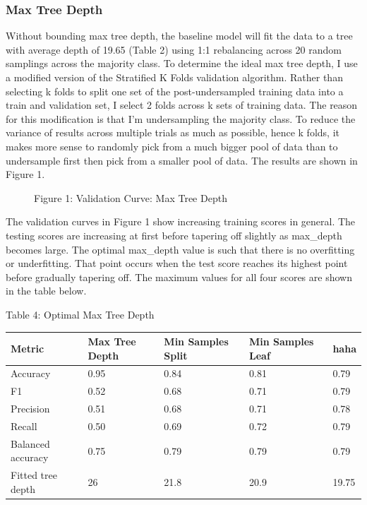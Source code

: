 \documentclass{article}
\begin{document}
\subsubsection*{Max Tree Depth}
Without bounding max tree depth, the baseline model will fit the data to a tree with average depth of 19.65 (Table 2) using 1:1 rebalancing across 20 random samplings across the majority class. To determine the ideal max tree depth, I use a modified version of the Stratified K Folds validation algorithm. Rather than selecting k folds to split one set of the post-undersampled training data into a train and validation set, I select 2 folds across k sets of training data. The reason for this modification is that I'm undersampling the majority class. To reduce the variance of results across multiple trials as much as possible, hence k folds, it makes more sense to randomly pick from a much bigger pool of data than to undersample first then pick from a smaller pool of data. The results are shown in Figure 1.

\begin{figure}
	\centering
	Figure 1: Validation Curve: Max Tree Depth
\end{figure}

The validation curves in Figure 1 show increasing training scores in general. The testing scores are increasing at first before tapering off slightly as max\_depth becomes large. The optimal max\_depth value is such that there is no overfitting or underfitting. That point occurs when the test score reaches its highest point before gradually tapering off. The maximum values for all four scores are shown in the table below.

\begin{center}
	Table 4: Optimal Max Tree Depth
	\begin{tabular}{ l l l l l }
		\hline
		Metric & Max Tree Depth & Min Samples Split & Min Samples Leaf & haha \\
		\hline
		Accuracy & 0.95 & 0.84 & 0.81 & 0.79 \\
		F1 & 0.52 & 0.68 & 0.71 & 0.79 \\
		Precision & 0.51 & 0.68 & 0.71 & 0.78 \\
		Recall & 0.50 & 0.69 & 0.72 & 0.79 \\
		Balanced accuracy & 0.75 & 0.79 & 0.79 & 0.79 \\
		Fitted tree depth & 26 & 21.8 & 20.9 & 19.75\\
		\hline 
		
		
	\end{tabular}
\end{center}
\end{document}
